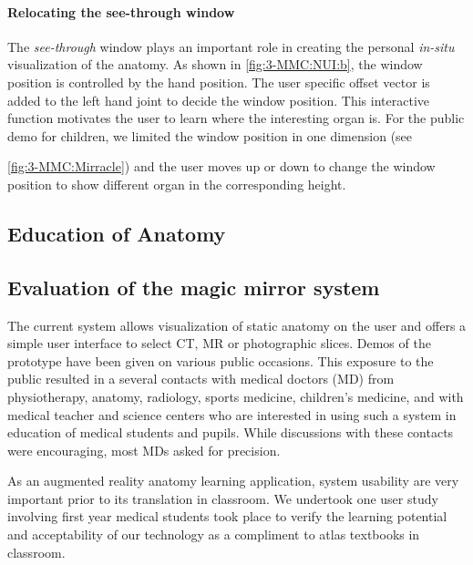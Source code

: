 {{{{{\paragraph{Relocating the see-through window}
The \textit{see-through} window plays an important role in creating the personal \textit{in-situ} visualization of the anatomy.
As shown in \figurename{\ref{fig:3-MMC:NUI:b}}, the window position is controlled by the hand position. The user specific offset vector is added to the left hand joint to decide the window position. This interactive function motivates the user to learn where the interesting organ is. For the public demo for children, we limited the window position in one dimension (see \figurename{\ref{fig:3-MMC:Mirracle}) and the user moves up or down to change the window position to show different organ in the corresponding height.
	
\subsection{Education of Anatomy}

\subsection{Evaluation of the magic mirror system}
The current system allows visualization of static anatomy on the user and offers a simple user interface to select CT, MR or photographic slices. Demos of the prototype have been given on various public occasions. This exposure to the public resulted in a several contacts with medical doctors (MD) from physiotherapy, anatomy, radiology, sports medicine, children's medicine, and with medical teacher and science centers who are interested in using such a system in education of medical students and pupils. While discussions with these contacts were encouraging, most MDs asked for precision.

As an augmented reality anatomy learning application, system usability are very important prior to its translation in classroom. We undertook one user study involving first year medical students took place to verify the learning potential and acceptability of our technology as a compliment to atlas textbooks in classroom.

}}}}}}

